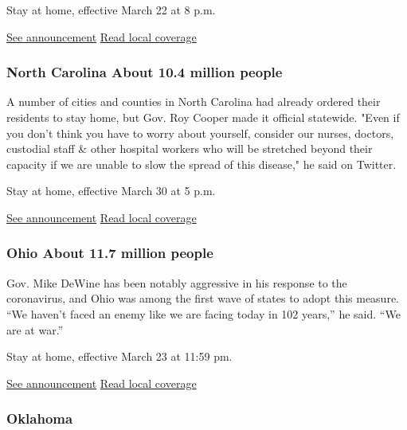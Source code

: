 Stay at home, effective March 22 at 8 p.m.

\href{https://coronavirus.health.ny.gov/new-york-state-pause}{See
announcement} \textbar{}
\href{https://www.nytimes3xbfgragh.onion/article/what-is-shelter-in-place-coronavirus.html}{Read
local coverage}

\hypertarget{north-carolina-about-104-million-people}{%
\subsubsection{North Carolina About 10.4 million
people}\label{north-carolina-about-104-million-people}}

A number of cities and counties in North Carolina had already ordered
their residents to stay home, but Gov. Roy Cooper made it official
statewide. "Even if you don't think you have to worry about yourself,
consider our nurses, doctors, custodial staff \& other hospital workers
who will be stretched beyond their capacity if we are unable to slow the
spread of this disease," he said on Twitter.

Stay at home, effective March 30 at 5 p.m.

\href{https://twitter.com/NC_Governor/status/1243629131646078976?s=20}{See
announcement} \textbar{}
\href{https://www.newsobserver.com/news/coronavirus/article241469211.html}{Read
local coverage}

\hypertarget{ohio-about-117-million-people}{%
\subsubsection{Ohio About 11.7 million
people}\label{ohio-about-117-million-people}}

Gov. Mike DeWine has been notably aggressive in his response to the
coronavirus, and Ohio was among the first wave of states to adopt this
measure. ``We haven't faced an enemy like we are facing today in 102
years,'' he said. ``We are at war.''

Stay at home, effective March 23 at 11:59 pm.

\href{https://content.govdelivery.com/attachments/OHOOD/2020/03/22/file_attachments/1407840/Stay\%20Home\%20Order.pdf}{See
announcement} \textbar{}
\href{https://www.dispatch.com/news/20200322/coronavirus-ohio-issues-stay-at-home-order-allows-only-essential-businesses-and-day-cares-at-6-children-per-room}{Read
local coverage}

\hypertarget{oklahoma}{%
\subsubsection{Oklahoma}\label{oklahoma}}

